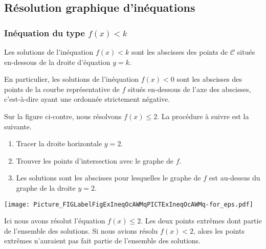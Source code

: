 \subsection{Résolution graphique d'inéquations}


\subsubsection{Inéquation du type $f(x)<k$}

\begin{Aretenir}
Les solutions de l'inéquation $f(x)<k$ sont les abscisses des points de $\mathscr{C}$ situés en-dessous de la droite d'équation $y=k$.

En particulier, les solutions de l'inéquation $f(x)<0$ sont les abscisses des points de la courbe représentative de \( f\) situés en-dessous de l'axe des abscisses, c'est-à-dire ayant une ordonnée strictement négative.
\end{Aretenir}

\begin{multicols}{2}
    Sur la figure ci-contre, nous résolvons \( f(x)\leq 2\). La procédure à suivre est la suivante.
    \begin{enumerate}
        \item
            Tracer la droite horizontale \( y=2\).
        \item
            Trouver les points d'intersection avec le graphe de \( f\).
        \item
            Les solutions sont les abscisses pour lesquelles le graphe de \( f\) est au-dessus du graphe de la droite \( y=2\).
    \end{enumerate}

    \columnbreak

\texttt{[image: Picture\_FIGLabelFigExIneqOcAWMqPICTExIneqOcAWMq-for\_eps.pdf]}

\end{multicols}


\begin{remark}
    Ici nous avons résolut l'équation \( f(x)\leq 2\). Les deux points extrêmes dont partie de l'ensemble des solutions. Si nous avions résolu \( f(x)<2\), alors les points extrêmes n'auraient pas fait partie de l'ensemble des solutions.
\end{remark}

